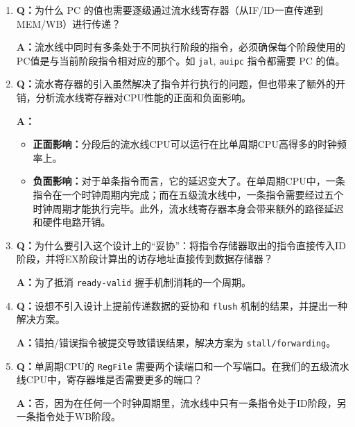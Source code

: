 \begin{enumerate}
\item \textbf{Q：}为什么 PC 的值也需要逐级通过流水线寄存器（从IF/ID一直传递到MEM/WB）进行传递？

\textbf{A：}流水线中同时有多条处于不同执行阶段的指令，必须确保每个阶段使用的PC值是与当前阶段指令相对应的那个。如 \texttt{jal}, \texttt{auipc} 指令都需要 PC 的值。

\item \textbf{Q：}流水寄存器的引入虽然解决了指令并行执行的问题，但也带来了额外的开销，分析流水线寄存器对CPU性能的正面和负面影响。

\textbf{A：}
\begin{itemize}
    \item \textbf{正面影响：}分段后的流水线CPU可以运行在比单周期CPU高得多的时钟频率上。
    \item \textbf{负面影响：}对于单条指令而言，它的延迟变大了。在单周期CPU中，一条指令在一个时钟周期内完成；而在五级流水线中，一条指令需要经过五个时钟周期才能执行完毕。此外，流水线寄存器本身会带来额外的路径延迟和硬件电路开销。
\end{itemize}

\item \textbf{Q：}为什么要引入这个设计上的“妥协”：将指令存储器取出的指令直接传入ID阶段，并将EX阶段计算出的访存地址直接传到数据存储器？

\textbf{A：}为了抵消 \texttt{ready-valid} 握手机制消耗的一个周期。

\item \textbf{Q：}设想不引入设计上提前传递数据的妥协和 \texttt{flush} 机制的结果，并提出一种解决方案。

\textbf{A：}错拍/错误指令被提交导致错误结果，解决方案为 \texttt{stall/forwarding}。

\item \textbf{Q：}单周期CPU的 \texttt{RegFile} 需要两个读端口和一个写端口。在我们的五级流水线CPU中，寄存器堆是否需要更多的端口？

\textbf{A：}否，因为在任何一个时钟周期里，流水线中只有一条指令处于ID阶段，另一条指令处于WB阶段。
\end{enumerate}